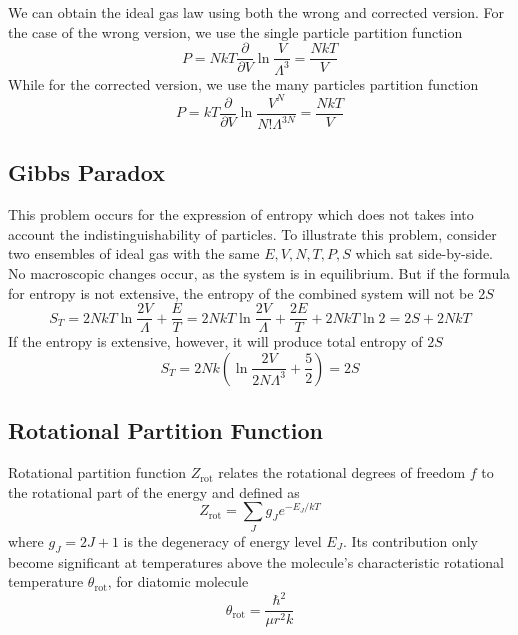 \documentclass[../../../Main.tex]{subfiles}
\begin{document}
We can obtain the ideal gas law using both the wrong and corrected version. For the case of the wrong version, we use the single particle partition function
\begin{equation*}
	P=NkT\frac{\partial}{\partial V} \ln \frac{V}{\Lambda^3}=\frac{NkT}{V}
\end{equation*}
While for the corrected version, we use the many particles partition function
\begin{equation*}
	P=kT\frac{\partial}{\partial V} \ln \frac{V^N}{N!\Lambda^{3N}}=\frac{NkT}{V}
\end{equation*}

\subsection{Gibbs Paradox}

This problem occurs for the expression of entropy which does not takes into account the indistinguishability of particles. To illustrate this problem, consider two ensembles of ideal gas with the same $E,V,N,T,P,S$ which sat side-by-side.  No macroscopic changes occur, as the system is in equilibrium. But if the formula for entropy is not extensive, the entropy of the combined system will not be $2S$
\begin{equation*}
	S_T=2NkT\ln\frac{2V}{\Lambda}+\frac{E}{T}=2NkT\ln\frac{2V}{\Lambda}+\frac{2E}{T}+2NkT\ln2=2S+2NkT
\end{equation*}
If the entropy is extensive, however, it will produce total entropy of $2S$
\begin{equation*}
	S_T=2Nk\left(\ln\frac{2V}{2N\Lambda^3}+\frac{5}{2}\right)=2S
\end{equation*}

\subsection{Rotational Partition Function}

Rotational partition function $Z_\text{rot}$ relates the rotational degrees of freedom $f$ to the rotational part of the energy and defined as
\begin{equation*}
	Z_\text{rot}=\sum_{J} g_Je^{-E_J/kT}
\end{equation*}
where $g_J=2J+1$ is the degeneracy of energy level $E_J$. Its contribution only become significant at temperatures above the molecule's characteristic rotational temperature $\theta_\text{rot}$, for diatomic molecule
\begin{equation*}
	\theta_\text{rot}=\frac{\hbar^2}{\mu r^2 k}
\end{equation*}
\end{document}
